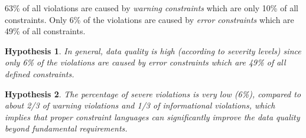 \documentclass{llncs}
\newtheorem{hyp}{Hypothesis}
\begin{document}
{{63\% of all violations are caused by \emph{warning constraints} which are only 10\% of all constraints. 
Only 6\% of the violations are caused by \emph{error constraints} which are 49\% of all constraints.

\begin{hyp}
In general, data quality is high (according to severity levels) since only 6\% of the violations are caused by error constraints which are 49\% of all defined constraints.
\end{hyp} 

\begin{hyp}
The percentage of severe violations is very low (6\%), compared to about 2/3 of warning violations and 1/3 of informational violations, which implies that proper constraint languages can significantly improve the data quality beyond fundamental requirements.
\end{hyp} 

}}
\end{document}
